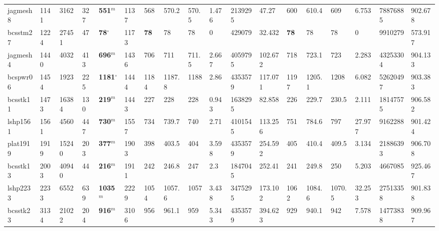 \begin{table}[h!]
{\begin{tabular}{llllllllllllllllll}
            jagmesh8 & 1141 & 3162 & 327 & \textbf{551}$^{m}$ & 1137 & 568 & 570.2 & 570.5 & 1.476 & 2139295 & 47.27 & 600 & 610.4 & 609 & 6.753 & 78876885 & 902.678 \\
            bcsstm27 & 1224 & 27451 & 47 & \textbf{78}$^{\circ}$ & 1173 & \textbf{78} & 78 & 78 & 0 & 429079 & 32.432 & \textbf{78} & 78 & 78 & 0 & 9910279 & 573.917 \\
            jagmesh4 & 1440 & 4032 & 413 & \textbf{696}$^{m}$ & 1436 & 706 & 711 & 711.5 & 2.667 & 4059795 & 102.672 & 718 & 723.1 & 723 & 2.283 & 43253304 & 904.133 \\
            bcspwr06 & 1454 & 1923 & 225 & \textbf{1181}$^{\circ}$ & 1444 & 1184 & 1187.8 & 1188 & 2.86 & 4353579 & 117.071 & 1197 & 1205.1 & 1208 & 6.082 & 52620497 & 903.383 \\
            bcsstk11 & 1473 & 16384 & 130 & \textbf{219}$^{m}$ & 1443 & 227 & 228 & 228 & 0.943 & 1638295 & 82.858 & 226 & 229.7 & 230.5 & 2.111 & 18147575 & 906.582 \\
            lshp1561 & 1561 & 4560 & 447 & \textbf{730}$^{m}$ & 1557 & 734 & 739.7 & 740 & 2.71 & 4101545 & 113.256 & 751 & 784.6 & 797 & 27.977 & 9162288 & 901.424 \\
            plat1919 & 1919 & 15240 & 203 & \textbf{377}$^{m}$ & 1903 & 398 & 403.5 & 404 & 3.598 & 4353579 & 254.592 & 405 & 410.4 & 409.5 & 3.134 & 21886393 & 906.708 \\
            bcsstk13 & 2003 & 40940 & 44 & \textbf{216}$^{m}$ & 1911 & 242 & 246.8 & 247 & 2.3 & 1847045 & 252.41 & 241 & 249.8 & 250 & 5.203 & 4667085 & 925.467 \\
            lshp2233 & 2233 & 6552 & 639 & \textbf{1035}$^{m}$ & 2229 & 1054 & 1057.6 & 1057 & 3.438 & 3475295 & 173.102 & 1062 & 1084.6 & 1070.5 & 32.253 & 27513358 & 901.838 \\
            bcsstk23 & 3134 & 21022 & 204 & \textbf{916}$^{m}$ & 3106 & 956 & 961.1 & 959 & 5.343 & 4353579 & 394.623 & 929 & 940.1 & 942 & 7.578 & 14773838 & 909.967 \\
            \bottomrule
        \end{tabular}
    }{
}
\end{table}

